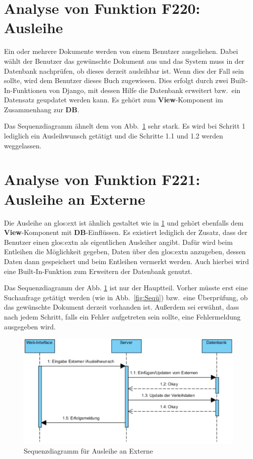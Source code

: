 \section{Analyse von Funktion F220: Ausleihe}
\label{f:220}
Ein oder mehrere Dokumente werden von einem Benutzer ausgeliehen. Dabei wählt der Benutzer das gewünschte Dokument aus und das System muss in der Datenbank nachprüfen, ob dieses derzeit ausleihbar ist. Wenn dies der Fall sein sollte, wird dem Benutzer dieses Buch zugewiesen. Dies erfolgt durch zwei Built-In-Funktionen von Django, mit dessen Hilfe die Datenbank erweitert bzw.\ ein Datensatz geupdatet werden kann. Es gehört zum \textbf{View}-Komponent im Zusammenhang zur \textbf{DB}.

Das Sequenzdiagramm ähnelt dem von Abb.\ \ref{fig:221} sehr stark. Es wird bei Schritt 1 lediglich ein Ausleihwunsch getätigt und die Schritte 1.1 und 1.2 werden weggelassen. 

\section{Analyse von Funktion F221: Ausleihe an Externe}
\label{f:221}
Die Ausleihe an \gls{glos:ext} ist ähnlich gestaltet wie in \ref{f:220}  und gehört ebenfalls dem \textbf{View}-Komponent mit \textbf{DB}-Einflüssen. Es existiert lediglich der Zusatz, dass der Benutzer einen \gls{glos:ext}n als eigentlichen Ausleiher angibt. Dafür wird beim Entleihen die Möglichkeit gegeben, Daten über den \gls{glos:ext}n anzugeben, dessen Daten dann gespeichert und beim Entleihen vermerkt werden. Auch hierbei wird eine Built-In-Funktion zum Erweitern der Datenbank genutzt.

Das Sequenzdiagramm der Abb. \ref{fig:221} ist nur der Hauptteil. Vorher müsste erst eine Suchanfrage getätigt werden (wie in Abb.\ \ref{fig:Seqü}) bzw.\ eine Überprüfung, ob das gewünschte Dokument derzeit vorhanden ist. Außerdem sei erwähnt, dass nach jedem Schritt, falls ein Fehler aufgetreten sein sollte, eine Fehlermeldung ausgegeben wird.

\begin{figure}
\begin{center}
\includegraphics[width=0.8\linewidth]{bilder/Seq-Ausleihe.pdf}
\caption{Sequenzdiagramm für Ausleihe an Externe}
\label{fig:221}
\end{center}
\end{figure}


